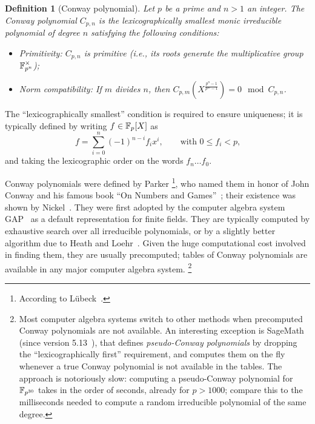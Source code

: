 \documentclass{sig-alternate}
\newtheorem{definition}{Definition}
\begin{document}
\begin{definition}[Conway polynomial]
  Let $p$ be a prime and $n>1$ an integer. %
  The \emph{Conway polynomial} $C_{p,n}$ is the
  \emph{lexicographically smallest} monic irreducible polynomial of
  degree $n$ satisfying the following conditions:
  \begin{itemize}
  \item \emph{Primitivity:} $C_{p,n}$ is primitive (i.e., its roots
    generate the multiplicative group $\mathbb{F}_{p^n}^\times$);
  \item \emph{Norm compatibility:} If $m$ divides $n$, then
    $C_{p,m}\left(X^{\frac{p^n-1}{p^m-1}}\right) = 0 \mod C_{p,n}$.
  \end{itemize}
\end{definition}

The ``lexicographically smallest'' condition is required to ensure
uniqueness; it is typically defined by writing $f\in\mathbb{F}_p[X]$ as
\begin{equation*}
  f = \sum_{i=0}^n (-1)^{n-i} f_i x^i,
  \qquad\text{with $0\le f_i<p$,}
\end{equation*}
and taking the lexicographic order on the words $f_n\dots f_0$.

Conway polynomials were defined by Parker%
\footnote{According to Lübeck~\cite{Luebeck}.}, %
who named them in honor of John Conway and his famous book ``On
Numbers and Games''~\cite{Conway:ONAG2000}; their existence was shown
by Nickel~\cite{Nickel1988}. %
They were first adopted by the computer algebra system GAP~\cite{GAP4}
as a default representation for finite fields. %
They are typically computed by exhaustive search over all irreducible
polynomials, or by a slightly better algorithm due to Heath and
Loehr~\cite{heath+loehr99}. %
Given the huge computational cost involved in finding them, they are
usually precomputed; tables of Conway polynomials are available in any
major computer algebra system.%
\footnote{Most computer algebra systems switch to other methods when
  precomputed Conway polynomials are not available. %
  An interesting exception is SageMath (since version
  5.13~\cite{Roe2013}), that defines \emph{pseudo-Conway polynomials}
  by dropping the ``lexicographically first'' requirement, and
  computes them on the fly whenever a true Conway polynomial is not
  available in the tables. %
  The approach is notoriously slow: computing a pseudo-Conway
  polynomial for $\mathbb{F}_{p^{30}}$ takes in the order of seconds, already
  for $p>1000$; compare this to the milliseconds needed to compute a
  random irreducible polynomial of the same degree.} %
\end{document}
